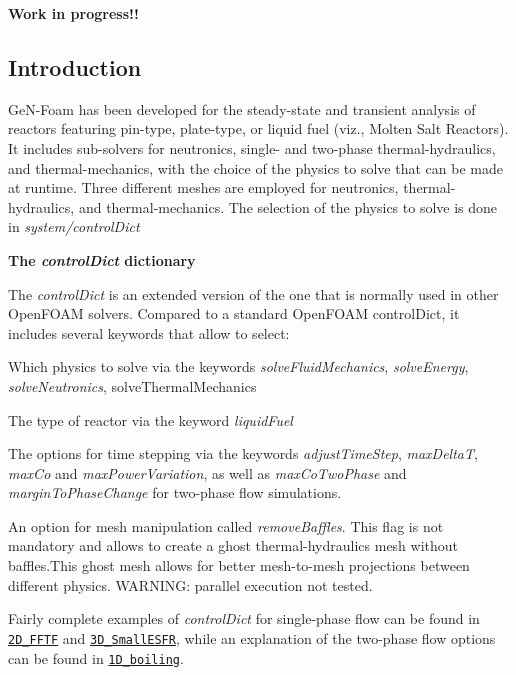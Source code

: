 {\bfseries Work in progress!!}

\subsection*{Introduction}

Ge\+N-\/\+Foam has been developed for the steady-\/state and transient analysis of reactors featuring pin-\/type, plate-\/type, or liquid fuel (viz., Molten Salt Reactors). It includes sub-\/solvers for neutronics, single-\/ and two-\/phase thermal-\/hydraulics, and thermal-\/mechanics, with the choice of the physics to solve that can be made at runtime. Three different meshes are employed for neutronics, thermal-\/hydraulics, and thermal-\/mechanics. The selection of the physics to solve is done in {\itshape system/control\+Dict}

 {\bfseries The {\itshape control\+Dict} dictionary}

The {\itshape control\+Dict} is an extended version of the one that is normally used in other Open\+F\+O\+AM solvers. Compared to a standard Open\+F\+O\+AM control\+Dict, it includes several keywords that allow to select\+: 
\begin{DoxyItemize}
\item Which physics to solve via the keywords {\itshape solve\+Fluid\+Mechanics}, {\itshape solve\+Energy}, {\itshape solve\+Neutronics}, solve\+Thermal\+Mechanics 
\item The type of reactor via the keyword {\itshape liquid\+Fuel} 
\item The options for time stepping via the keywords {\itshape adjust\+Time\+Step}, {\itshape max\+DeltaT}, {\itshape max\+Co} and {\itshape max\+Power\+Variation}, as well as {\itshape max\+Co\+Two\+Phase} and {\itshape margin\+To\+Phase\+Change} for two-\/phase flow simulations. 
\item An option for mesh manipulation called {\itshape remove\+Baffles}. This flag is not mandatory and allows to create a ghost thermal-\/hydraulics mesh without baffles.\+This ghost mesh allows for better mesh-\/to-\/mesh projections between different physics. W\+A\+R\+N\+I\+NG\+: parallel execution not tested. 
\end{DoxyItemize}Fairly complete examples of {\itshape control\+Dict} for single-\/phase flow can be found in \href{https://gitlab.com/foam-for-nuclear/GeN-Foam/-/blob/master/Tutorials/2D_FFTF/rootCase/system/controlDict}{\tt 2\+D\+\_\+\+F\+F\+TF} and \href{https://gitlab.com/foam-for-nuclear/GeN-Foam/-/blob/master/Tutorials/3D_SmallESFR/rootCase/system/controlDict}{\tt 3\+D\+\_\+\+Small\+E\+S\+FR}, while an explanation of the two-\/phase flow options can be found in \href{https://gitlab.com/foam-for-nuclear/GeN-Foam/-/blob/master/Tutorials/1D_boiling/system/controlDict}{\tt 1\+D\+\_\+boiling}. 

